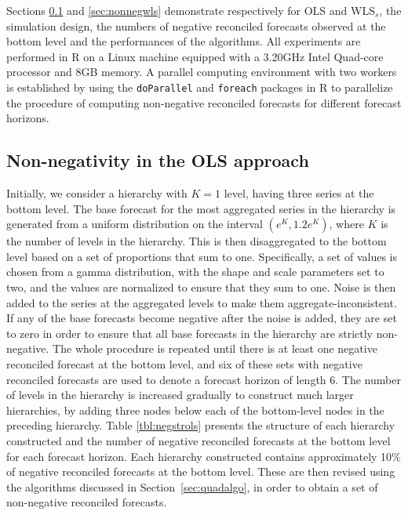 \documentclass[11pt]{article}
\newcommand{\0}{\phantom{0}}
\begin{document}
Sections \ref{sec:nonnegols} and \ref{sec:nonnegwls} demonstrate respectively for OLS and WLS$_{s}$, the simulation design, the numbers of negative reconciled forecasts observed at the bottom level and the performances of the algorithms. All experiments are performed in R on a Linux machine equipped with a 3.20GHz Intel Quad-core processor and 8GB memory. A parallel computing environment with two workers is established by using the \texttt{doParallel} \citep{doparallel2015} and \texttt{foreach} \citep{foreach2015} packages in R to parallelize the procedure of computing non-negative reconciled forecasts for different forecast horizons.  

\subsection{Non-negativity in the OLS approach}
\label{sec:nonnegols}

Initially, we consider a hierarchy with $K=1$ level, having three series at the bottom level. The base forecast for the most aggregated series in the hierarchy is generated from a uniform distribution on the interval $(e^{K}, 1.2e^{K})$, where $K$ is the number of levels in the hierarchy. This is then disaggregated to the bottom level based on a set of proportions that sum to one. Specifically, a set of values is chosen from a gamma distribution, with the shape and scale parameters set to two, and the values are normalized to ensure that they sum to one. Noise is then added to the series at the aggregated levels to make them aggregate-inconsistent. If any of the base forecasts become negative after the noise is added, they are set to zero in order to ensure that all base forecasts in the hierarchy are strictly non-negative. The whole procedure is repeated until there is at least one negative reconciled forecast at the bottom level, and six of these sets with negative reconciled forecasts are used to denote a forecast horizon of length 6. The number of levels in the hierarchy is increased gradually to construct much larger hierarchies, by adding three nodes below each of the bottom-level nodes in the preceding hierarchy. Table \ref{tbl:negstrols} presents the structure of each hierarchy constructed and the number of negative reconciled forecasts at the bottom level for each forecast horizon. Each hierarchy constructed contains approximately 10\% of negative reconciled forecasts at the bottom level. These are then revised using the algorithms discussed in Section~\ref{sec:quadalgo}, in order to obtain a set of non-negative reconciled forecasts.
\end{document}
